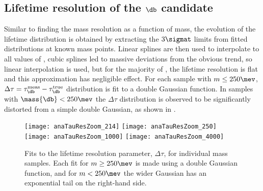 

\subsection[Lifetime resolution of the \db candidate]
{Lifetime resolution of the $\boldsymbol{\db}$ candidate}
Similar to finding the mass resolution as a function of mass, the evolution of the lifetime
distribution is obtained by extracting the $3\sigmat$ limits from fitted distributions at known \db
mass points.
Linear splines are then used to interpolate to all values of \mass{\db}, cubic splines led to
massive deviations from the obvious trend, so linear interpolation is used, but for the majority of
\mass{\dm}, the lifetime resolution is flat and this approximation has negligible effect.
For each \btokstrdb sample with $m\leq250\mev$,
$\Delta\tau=\tau^\mathrm{meas}_{\db}-\tau^\mathrm{true}_{\db}$ distribution is fit to a double
Gaussian function.
In samples with $\mass{\db}<250\mev$ the $\Delta\tau$ distribution is observed to be significantly
distorted from a simple double Gaussian, as shown in .

\begin{figure}
  \begin{center}
    \texttt{[image: anaTauResZoom\_214]}
    \texttt{[image: anaTauResZoom\_250]}
    \texttt{[image: anaTauResZoom\_1000]}
    \texttt{[image: anaTauResZoom\_4000]}
  \end{center}
  \caption[Fits to the lifetime resolution for simulated ]
  {
    Fits to the lifetime resolution parameter, $\Delta\tau$, for individual mass samples.
    Each fit for $m\geq250\mev$ is made using a double Gaussian function, and for $m<250\mev$ the
    wider Gaussian has an exponential tail on the right-hand side.
  }
  \label{fig:taures:zoom}
\end{figure}

